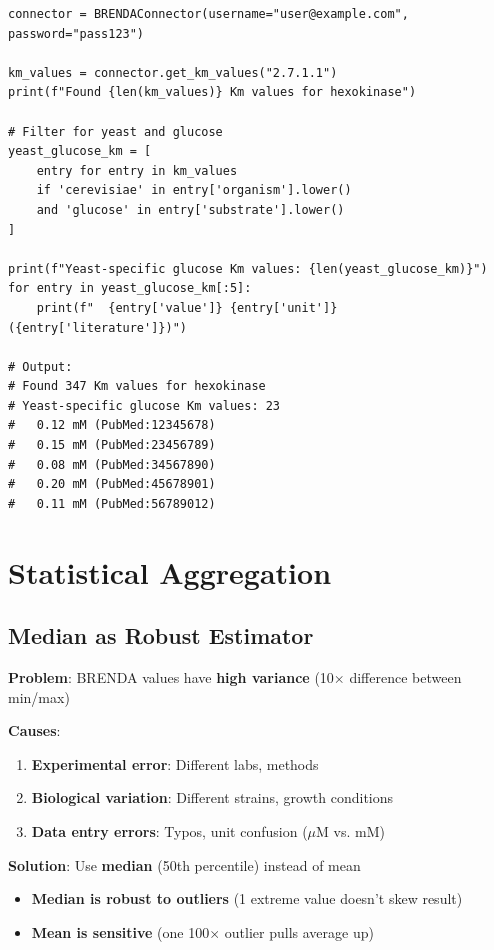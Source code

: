 \begin{verbatim}
connector = BRENDAConnector(username="user@example.com", password="pass123")

km_values = connector.get_km_values("2.7.1.1")
print(f"Found {len(km_values)} Km values for hexokinase")

# Filter for yeast and glucose
yeast_glucose_km = [
    entry for entry in km_values
    if 'cerevisiae' in entry['organism'].lower() 
    and 'glucose' in entry['substrate'].lower()
]

print(f"Yeast-specific glucose Km values: {len(yeast_glucose_km)}")
for entry in yeast_glucose_km[:5]:
    print(f"  {entry['value']} {entry['unit']} ({entry['literature']})")

# Output:
# Found 347 Km values for hexokinase
# Yeast-specific glucose Km values: 23
#   0.12 mM (PubMed:12345678)
#   0.15 mM (PubMed:23456789)
#   0.08 mM (PubMed:34567890)
#   0.20 mM (PubMed:45678901)
#   0.11 mM (PubMed:56789012)
\end{verbatim}

\section{Statistical Aggregation}
\label{sec:statistical-aggregation}

\subsection{Median as Robust Estimator}
\label{subsec:median-estimator}

\textbf{Problem}: BRENDA values have \textbf{high variance} (10$\times$ difference between min/max)

\textbf{Causes}:

\begin{enumerate}
    \item \textbf{Experimental error}: Different labs, methods
    \item \textbf{Biological variation}: Different strains, growth conditions
    \item \textbf{Data entry errors}: Typos, unit confusion ($\mu$M vs. mM)
\end{enumerate}

\textbf{Solution}: Use \textbf{median} (50th percentile) instead of mean

\begin{itemize}
    \item \textbf{Median is robust to outliers} (1 extreme value doesn't skew result)
    \item \textbf{Mean is sensitive} (one 100$\times$ outlier pulls average up)
\end{itemize}

